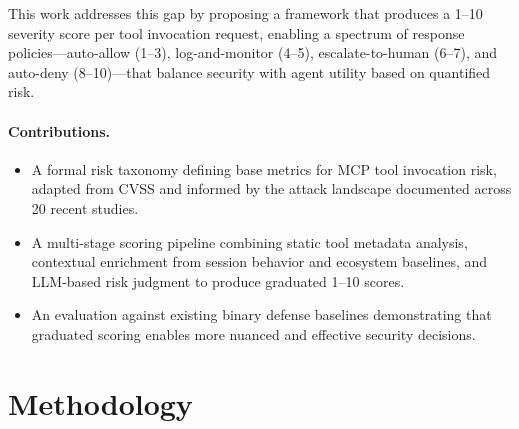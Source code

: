 \documentclass[12pt]{article}
\begin{document}
This work addresses this gap by proposing a framework that produces a 1--10 severity score per tool invocation request, enabling a spectrum of response policies---auto-allow (1--3), log-and-monitor (4--5), escalate-to-human (6--7), and auto-deny (8--10)---that balance security with agent utility based on quantified risk.

\paragraph{Contributions.}
\begin{itemize}
    \item A formal risk taxonomy defining base metrics for MCP tool invocation risk, adapted from CVSS and informed by the attack landscape documented across 20 recent studies.
    \item A multi-stage scoring pipeline combining static tool metadata analysis, contextual enrichment from session behavior and ecosystem baselines, and LLM-based risk judgment to produce graduated 1--10 scores.
    \item An evaluation against existing binary defense baselines demonstrating that graduated scoring enables more nuanced and effective security decisions.
\end{itemize}

\section{Methodology}
\label{sec:methodology}




\newpage
\end{document}

